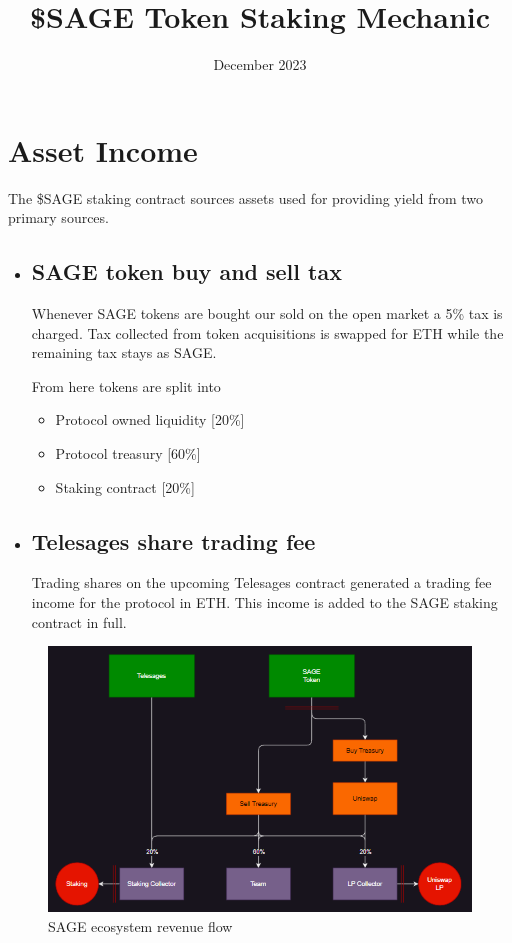 \documentclass{article}
\title{\vspace{-2.5cm}\$SAGE Token Staking Mechanic}
\date{December 2023}
\begin{document}
\maketitle

\section{Asset Income}

The \$SAGE staking contract sources assets used for providing yield from two primary sources.
\begin{itemize}
    \item \subsection{SAGE token buy and sell tax} 
        Whenever SAGE tokens are bought our sold on the open market a 5\% tax is charged.
        Tax collected from token acquisitions is swapped for ETH while the remaining tax stays as SAGE.
        
        From here tokens are split into
        \begin{itemize}
            \item Protocol owned liquidity [20\%]
            \item Protocol treasury [60\%]
            \item Staking contract [20\%]
        \end{itemize}
    \item \subsection{Telesages share trading fee}
        Trading shares on the upcoming Telesages contract generated a trading fee income for the protocol in ETH. This income is added to the SAGE staking contract in full.
\end{itemize}

\begin{figure}[h!]
\centering
\includegraphics[width=0.75\linewidth]{asset-flow.png}
\caption{SAGE ecosystem revenue flow}
\end{figure}
\end{document}
